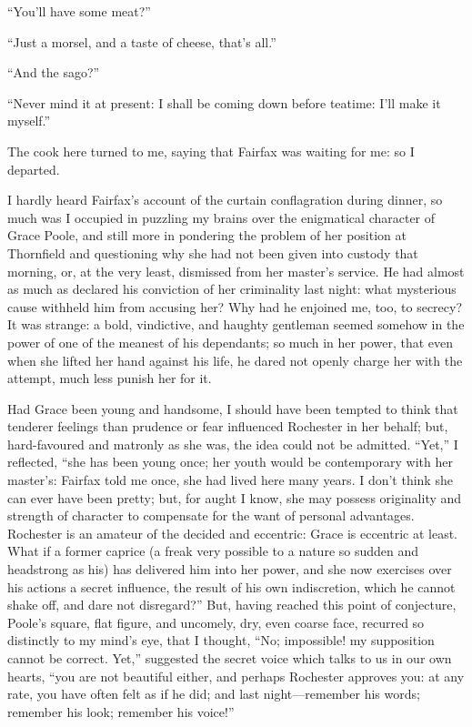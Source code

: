 \enquote{You'll have some meat?}

\enquote{Just a morsel, and a taste of cheese, that's all.}

\enquote{And the sago?}

\enquote{Never mind it at present: I shall be coming down before
	teatime: I'll make it myself.}

The cook here turned to me, saying that \Mrs{} Fairfax was waiting for me:
so I departed.

I hardly heard \Mrs{} Fairfax's account of the curtain conflagration
during dinner, so much was I occupied in puzzling my brains over the
enigmatical character of Grace Poole, and still more in pondering the
problem of her position at Thornfield and questioning why she had not
been given into custody that morning, or, at the very least, dismissed
from her master's service.  He had almost as much as declared his
conviction of her criminality last night: what mysterious cause withheld
him from accusing her?  Why had he enjoined me, too, to secrecy?  It was
strange: a bold, vindictive, and haughty gentleman seemed somehow in the
power of one of the meanest of his dependants; so much in her power,
that even when she lifted her hand against his life, he dared not openly
charge her with the attempt, much less punish her for it.

Had Grace been young and handsome, I should have been tempted to think
that tenderer feelings than prudence or fear influenced \Mr{} Rochester in
her behalf; but, hard-favoured and matronly as she was, the idea could
not be admitted.  \enquote{Yet,} I reflected, \enquote{she has been
	young once; her youth would be contemporary with her master's: \Mrs{}
	Fairfax told me once, she had lived here many years.  I don't think she
	can ever have been pretty; but, for aught I know, she may possess
	originality and strength of character to compensate for the want of
	personal advantages.  \Mr{} Rochester is an amateur of the decided and
	eccentric: Grace is eccentric at least.  What if a former caprice (a
	freak very possible to a nature so sudden and headstrong as his) has
	delivered him into her power, and she now exercises over his actions a
	secret influence, the result of his own indiscretion, which he cannot
	shake off, and dare not disregard?}  But, having reached this point of
conjecture, \Mrs{} Poole's square, flat figure, and uncomely, dry, even
coarse face, recurred so distinctly to my mind's eye, that I thought,
\enquote{No; impossible! my supposition cannot be correct.  Yet,}
suggested the secret voice which talks to us in our own hearts,
\enquote{you are not beautiful either, and perhaps \Mr{} Rochester
	approves you: at any rate, you have often felt as if he did; and last
	night---remember his words; remember his look; remember his voice!}

